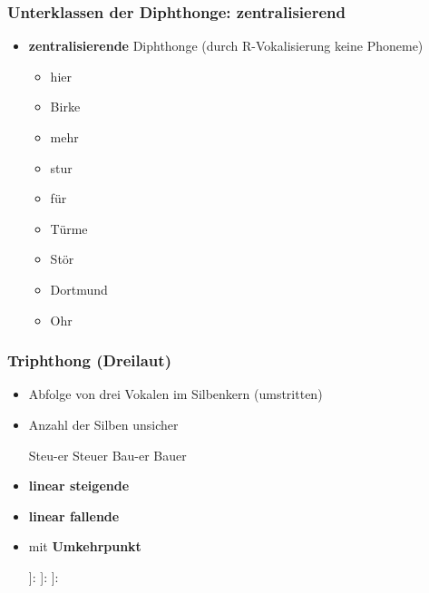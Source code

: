 \begin{frame}
\frametitle{Unterklassen der Diphthonge: zentralisierend}

	\begin{itemize}
		\item \textbf{zentralisierende} Diphthonge (durch R-Vokalisierung \ras keine Phoneme)

		\ea 
		\begin{itemize}
			\item {} \ras hier
			\item {} \ras Birke
			\item {} \ras mehr
			\item {} \ras stur
			\item {} \ras für
			\item {} \ras Türme
			\item {} \ras Stör
			\item {} \ras Dortmund
			\item {} \ras Ohr
		\end{itemize}
		\z
		
	\end{itemize}

\end{frame}


\begin{frame}
\frametitle{Triphthong (Dreilaut)}
	
\begin{itemize}
	\item Abfolge von drei Vokalen im Silbenkern (umstritten)
	\item Anzahl der Silben unsicher

\pause 
			
	\ea Steu-er \vs Steuer
	\ex Bau-er \vs Bauer
	\z

\pause
			
	\item \textbf{linear steigende}
	\item \textbf{linear fallende}
	\item mit \textbf{Umkehrpunkt}

	\ea {[}]: 
	\ex {[}]: 
	\ex {[}]: 
	\z	
	
\end{itemize}

\end{frame}

